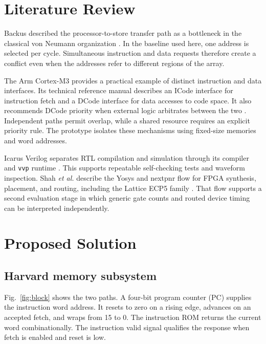 \documentclass[conference]{IEEEtran}
\begin{document}
\section{Literature Review}
Backus described the processor-to-store transfer path as a bottleneck in the classical von Neumann organization \cite{backus}. In the baseline used here, one address is selected per cycle. Simultaneous instruction and data requests therefore create a conflict even when the addresses refer to different regions of the array.

The Arm Cortex-M3 provides a practical example of distinct instruction and data interfaces. Its technical reference manual describes an ICode interface for instruction fetch and a DCode interface for data accesses to code space. It also recommends DCode priority when external logic arbitrates between the two \cite{arm}. Independent paths permit overlap, while a shared resource requires an explicit priority rule. The prototype isolates these mechanisms using fixed-size memories and word addresses.

Icarus Verilog separates RTL compilation and simulation through its compiler and \texttt{vvp} runtime \cite{icarus}. This supports repeatable self-checking tests and waveform inspection. Shah \emph{et al.} describe the Yosys and nextpnr flow for FPGA synthesis, placement, and routing, including the Lattice ECP5 family \cite{shah}. That flow supports a second evaluation stage in which generic gate counts and routed device timing can be interpreted independently.

\section{Proposed Solution}
\subsection{Harvard memory subsystem}
Fig.~\ref{fig:block} shows the two paths. A four-bit program counter (PC) supplies the instruction word address. It resets to zero on a rising edge, advances on an accepted fetch, and wraps from 15 to 0. The instruction ROM returns the current word combinationally. The instruction valid signal qualifies the response when fetch is enabled and reset is low.
\end{document}

